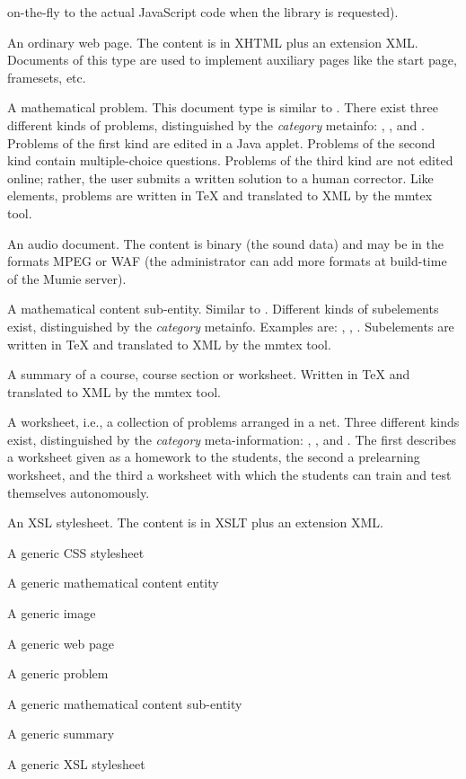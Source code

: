 \documentclass{generic}
\begin{document}
\begin{description}
  on-the-fly to the actual JavaScript code when the library is requested).
\item[\code{page}] An ordinary web page. The content is in XHTML plus an
  extension XML. Documents of this type are used to implement auxiliary pages
  like the start page, framesets, etc.
\item[\code{problem}] A mathematical problem. This document type is similar to
  . There exist three different kinds of problems, distinguished
  by the \emph{category} metainfo: , , and
  . Problems of the first kind are edited in a Java applet.
  Problems of the second kind contain multiple-choice questions. Problems of
  the third kind are not edited online; rather, the user submits a written
  solution to a human corrector.  Like elements, problems are written in TeX
  and translated to XML by the mmtex tool.
\item[\code{sound}] An audio document. The content is binary (the sound data)
  and may be in the formats MPEG or WAF (the administrator can add more
  formats at build-time of the Mumie server).
\item[\code{subelement}] A mathematical content sub-entity. Similar to
  . Different kinds of subelements exist, distinguished by the
  \emph{category} metainfo. Examples are: , ,
  . Subelements are written in TeX and translated to XML by the
  mmtex tool.
\item[\code{summary}] A summary of a course, course section or worksheet.
  Written in TeX and translated to XML by the mmtex tool.
\item[\code{worksheet}] A worksheet, i.e., a collection of problems arranged in
  a net. Three different kinds exist, distinguished by the \emph{category}
  meta-information: , , and . The
  first describes a worksheet given as a homework to the students, the second a
  prelearning worksheet, and the third a worksheet with which the students can
  train and test themselves autonomously.
\item[\code{xsl_stylesheet}] An XSL stylesheet. The content is in XSLT plus an
  extension XML.
\item[\code{generic_css_stylesheet}]  A generic CSS stylesheet 
\item[\code{generic_element}]  A generic mathematical content entity 
\item[\code{generic_image}]  A generic image 
\item[\code{generic_page}]  A generic web page 
\item[\code{generic_problem}]  A generic problem
\item[\code{generic_subelement}]  A generic mathematical content sub-entity 
\item[\code{generic_summary}]  A generic summary 
\item[\code{generic_xsl_stylesheet}]  A generic XSL stylesheet
\end{description}
\end{document}
